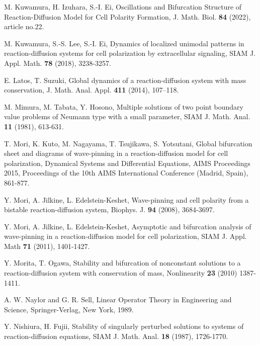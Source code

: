 \documentclass[a4,10pt]{article}
\begin{document}
\begin{thebibliography}{99}
M. Kuwamura, H. Izuhara, S.-I. Ei, 
Oscillations and Bifurcation Structure of Reaction-Diffusion Model for Cell Polarity Formation,
J. Math. Biol. {\bf 84} (2022), article no.22. 

M. Kuwamura, S.-S. Lee, S.-I. Ei, 
Dynamics of localized unimodal patterns in reaction-diffusion systems for cell polarization by extracellular signaling,
SIAM J. Appl. Math. {\bf 78} (2018), 3238-3257.

E. Latos, T. Suzuki,
Global dynamics of a reaction-diffusion system with mass conservation,
J. Math. Anal. Appl. {\bf 411} (2014), 107--118.


 M. Mimura, M. Tabata, Y. Hosono,
Multiple solutions of two point boundary value problems of Neumann type with a small parameter,
SIAM J. Math. Anal. {\bf 11} (1981), 613-631.

T. Mori, K. Kuto, M. Nagayama, T. Tsujikawa, S. Yotsutani,
Global bifurcation sheet and diagrams of wave-pinning in a reaction-diffusion model 
for cell polarization,
Dynamical Systems and Differential Equations, AIMS Proceedings 2015,
Proceedings of the 10th AIMS International Conference (Madrid, Spain), 861-877.

 Y. Mori, A. Jilkine, L. Edelstein-Keshet,
Wave-pinning and cell polarity from a bistable reaction-diffusion system,
Biophys. J.  {\bf 94} (2008), 3684-3697. 

 Y. Mori, A. Jilkine, L. Edelstein-Keshet,
Asymptotic and bifurcation analysis of wave-pinning in a reaction-diffusion model 
for cell polarization,
SIAM J. Appl. Math {\bf 71} (2011), 1401-1427. 

 Y. Morita, T. Ogawa, 
Stability and bifurcation of nonconstant solutions to a reaction-diffusion system with conservation of mass, Nonlinearity {\bf 23} (2010) 1387-1411.  

 A. W. Naylor and G. R. Sell, 
Linear Operator Theory in Engineering and Science,
Springer-Verlag, New York, 1989.

 Y. Nishiura, H. Fujii, 
Stability of singularly perturbed solutions to systems of reaction-diffusion equations,
SIAM J. Math. Anal. {\bf 18} (1987), 1726-1770.



\end{thebibliography}
\end{document}
